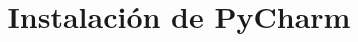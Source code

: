 \documentclass[aspectratio=169]{beamer}
\title[Instalación de PyCharm]{Instalación de PyCharm} %
\begin{document}
\begin{frame}
    \titlepage
\end{frame}


\end{document}
